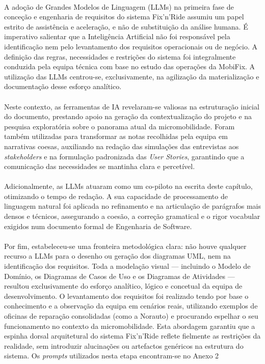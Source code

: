 \documentclass[a4paper,12pt]{scrreprt}
\begin{document}
\paragraph{}A adoção de Grandes Modelos de Linguagem (LLMs) na primeira fase de conceção e engenharia de requisitos do sistema Fix'n'Ride assumiu um papel estrito de assistência e aceleração, e não de substituição da análise humana. É imperativo salientar que a Inteligência Artificial não foi responsável pela identificação nem pelo levantamento dos requisitos operacionais ou de negócio. A definição das regras, necessidades e restrições do sistema foi integralmente conduzida pela equipa técnica com base no estudo das operações da MobiFix. A utilização das LLMs centrou-se, exclusivamente, na agilização da materialização e documentação desse esforço analítico. \paragraph{}Neste contexto, as ferramentas de IA revelaram-se valiosas na estruturação inicial do documento, prestando apoio na geração da contextualização do projeto e na pesquisa exploratória sobre o panorama atual da micromobilidade. Foram também utilizadas para transformar as notas recolhidas pela equipa em narrativas coesas, auxiliando na redação das simulações das entrevistas aos \textit{stakeholders} e na formulação padronizada das \textit{User Stories}, garantindo que a comunicação das necessidades se mantinha clara e percetível. \paragraph{}Adicionalmente, as LLMs atuaram como um co-piloto na escrita deste capítulo, otimizando o tempo de redação. A sua capacidade de processamento de linguagem natural foi aplicada no refinamento e na articulação de parágrafos mais densos e técnicos, assegurando a coesão, a correção gramatical e o rigor vocabular exigidos num documento formal de Engenharia de Software. \paragraph{}Por fim, estabeleceu-se uma fronteira metodológica clara: não houve qualquer recurso a LLMs para o desenho ou geração dos diagramas UML, nem na identificação dos requisitos. Toda a modelação visual — incluindo o Modelo de Domínio, os Diagramas de Casos de Uso e os Diagramas de Atividades — resultou exclusivamente do esforço analítico, lógico e concetual da equipa de desenvolvimento. O levantamento dos requisitos foi realizado tendo por base o conhecimento e a observação da equipa em cenários reais, utilizando exemplos de oficinas de reparação consolidadas (como a Norauto) e procurando espelhar o seu funcionamento no contexto da micromobilidade. Esta abordagem garantiu que a espinha dorsal arquitetural do sistema Fix'n'Ride reflete fielmente as restrições da realidade, sem introduzir alucinações ou artefactos genéricos na estrutura do sistema. Os \textit{prompts} utilizados nesta etapa encontram-se no Anexo 2
\end{document}
